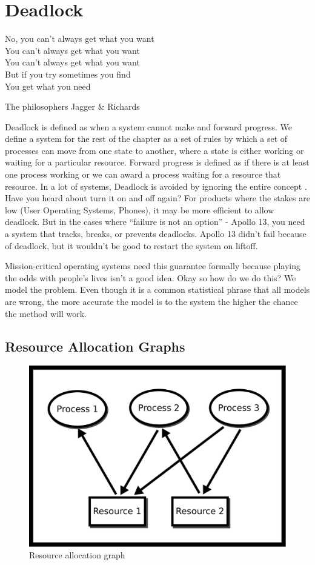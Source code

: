 \chapter{Deadlock}

\epigraph{No, you can't always get what you want
	\\You can't always get what you want
	\\You can't always get what you want
	\\But if you try sometimes you find
	\\You get what you need}{The philosophers Jagger \& Richards}

Deadlock is defined as when a system cannot make and forward progress.
We define a system for the rest of the chapter as a set of rules by which a set of processes can move from one state to another, where a state is either working or waiting for a particular resource.
Forward progress is defined as if there is at least one process working or we can award a process waiting for a resource that resource.
In a lot of systems, Deadlock is avoided by ignoring the entire concept \cite[P.237]{silberschatz2006operating}.
Have you heard about turn it on and off again?
For products where the stakes are low (User Operating Systems, Phones), it may be more efficient to allow deadlock.
But in the cases where ``failure is not an option'' - Apollo 13, you need a system that tracks, breaks, or prevents deadlocks.
Apollo 13 didn't fail because of deadlock, but it wouldn't be good to restart the system on liftoff.

Mission-critical operating systems need this guarantee formally because playing the odds with people's lives isn't a good idea.
Okay so how do we do this? We model the problem.
Even though it is a common statistical phrase that all models are wrong, the more accurate the model is to the system the higher the chance the method will work.

\section{Resource Allocation Graphs}

\begin{figure}[H]
	\centering
	\includegraphics[width=.6\textwidth]{deadlock/drawings/rag.eps}
	\caption{Resource allocation graph}
	\label{ragfigure}
\end{figure}

